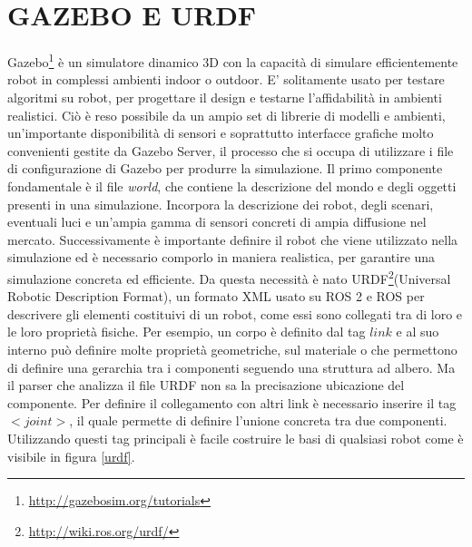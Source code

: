 \documentclass[a4paper,11 pt,oneside]{book}
\theoremstyle{definition}
\begin{document}
\vspace{20mm}
\vspace{20mm}
\vspace{20mm}
\vspace{20mm}
\vspace{20mm}
\vspace{10mm}
\vspace{10mm}
\vspace{10mm}
\vspace{10mm}
\vspace{10mm}
\vspace{10mm}
\vspace{10mm}


\section{GAZEBO E URDF}
Gazebo\footnote{\url{http://gazebosim.org/tutorials}} è un simulatore dinamico 3D con la capacità di simulare efficientemente robot in complessi ambienti indoor o outdoor. E' solitamente usato per testare algoritmi su robot, per progettare il design e testarne l'affidabilità in ambienti realistici.
Ciò è reso possibile da un ampio set di librerie di modelli e ambienti, un'importante disponibilità di sensori e soprattutto interfacce grafiche molto convenienti gestite da Gazebo Server, il processo che si occupa di utilizzare i file di configurazione di Gazebo per produrre la simulazione.
Il primo componente fondamentale è il file \emph{world}, che contiene la descrizione del mondo e degli oggetti presenti in una simulazione. Incorpora la descrizione dei robot, degli scenari, eventuali luci e un'ampia gamma di sensori concreti di ampia diffusione nel mercato.
Successivamente è importante definire il robot che viene utilizzato nella simulazione ed è necessario comporlo in maniera realistica, per garantire una simulazione concreta ed efficiente. Da questa necessità è nato URDF\footnote{\url{http://wiki.ros.org/urdf/}}(Universal Robotic Description Format), un formato XML usato su ROS 2 e ROS per descrivere gli elementi costituivi di un robot, come essi sono collegati tra di loro e le loro proprietà fisiche.
Per esempio, un corpo è definito dal tag $link$ e al suo interno può definire molte proprietà geometriche, sul materiale o che permettono di definire una gerarchia tra i componenti seguendo una struttura ad albero. Ma il parser che analizza il file URDF non sa la precisazione ubicazione del componente. Per definire il collegamento con altri link è necessario inserire il tag $<joint>$, il quale permette di definire l'unione concreta tra due componenti. Utilizzando questi tag principali è facile costruire le basi di qualsiasi robot come è visibile in figura \ref{urdf}.
\end{document}
